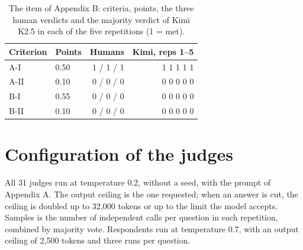 \documentclass{IOS-Book-Article}
\begin{document}
\begin{table}[!ht]
\centering
\caption{The item of Appendix B: criteria, points, the three human verdicts and the majority verdict of Kimi K2.5 in each of the five repetitions (1 = met).}
\footnotesize\setlength{\tabcolsep}{2pt}
\begin{tabular}{llrr}
\hline
\textbf{Criterion} & \textbf{Points} & \textbf{Humans} & \textbf{Kimi, reps 1--5} \\
\hline
A-I & 0.50 & 1 / 1 / 1 & 1 1 1 1 1 \\
A-II & 0.10 & 0 / 0 / 0 & 0 0 0 0 0 \\
B-I & 0.55 & 0 / 0 / 0 & 0 0 0 0 0 \\
B-II & 0.10 & 0 / 0 / 0 & 0 0 0 0 0 \\
\hline
\end{tabular}
\end{table}


\section{Configuration of the judges}

All 31 judges run at temperature 0.2, without a seed, with the prompt of Appendix A. The output ceiling is the one requested; when an answer is cut, the ceiling is doubled up to 32,000 tokens or up to the limit the model accepts. Samples is the number of independent calls per question in each repetition, combined by majority vote. Respondents run at temperature 0.7, with an output ceiling of 2,500 tokens and three runs per question.
\end{document}
